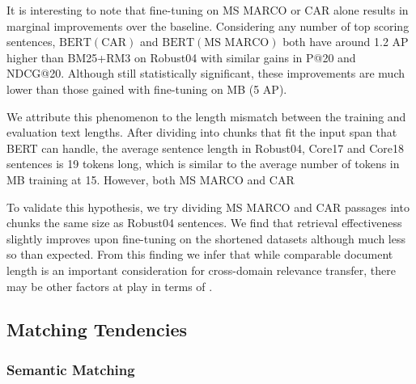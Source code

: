 It is interesting to note that fine-tuning on MS MARCO or CAR alone results in marginal improvements over the baseline.
Considering any number of top scoring sentences, $ \textrm{BERT}(\textrm{CAR}) $ and $ \textrm{BERT}(\textrm{MS MARCO}) $ both have around 1.2 AP higher than BM25+RM3 on Robust04 with similar gains in P@20 and NDCG@20.
Although still statistically significant, these improvements are much lower than those gained with fine-tuning on MB (5 AP).

We attribute this phenomenon to the length mismatch between the training and evaluation text lengths.
After dividing into chunks that fit the input span that BERT can handle, the average sentence length in Robust04, Core17 and Core18 sentences is 19 tokens long, which is similar to the average number of tokens in MB training at 15.
However, both MS MARCO and CAR 

To validate this hypothesis, we try dividing MS MARCO and CAR passages into chunks the same size as Robust04 sentences.
We find that retrieval effectiveness slightly improves upon fine-tuning on the shortened datasets although much less so than expected.
From this finding we infer that while comparable document length is an important consideration for cross-domain relevance transfer, there may be other factors at play in terms of .

\subsection{Matching Tendencies}

\subsubsection{Semantic Matching}

\begin{table*}[b!]
\caption{}
\label{tab:results-pruned}
\end{table*}

